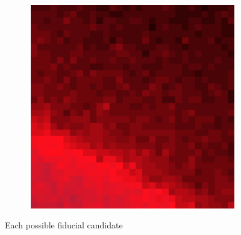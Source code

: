\documentclass[10pt]{scrartcl}
\begin{document}
\begin{figure}[!ht]
\begin{subfigure}[b]{.3\linewidth}
    \end{subfigure}
    \begin{subfigure}[b]{.3\linewidth}
        \centering
        \includegraphics[width=1.2\linewidth]{../plots_tables_images/1d1dcrop_6_9.eps}
    \end{subfigure}
    \caption{Each possible fiducial candidate}
    \label{lotsofcrop}
\end{figure}
\end{document}
